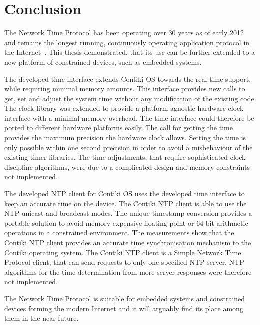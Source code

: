 




\chapter{Conclusion}
The Network Time Protocol has been operating over 30 years as of early 2012
and remains the longest running, continuously operating application
protocol in the Internet~\cite{ntp-y2k}.
This thesis demonstrated, that its use can be further extended to a new platform of constrained devices,
such as embedded systems.

The developed time interface extends Contiki OS towards the real-time support,
while requiring minimal memory amounts.
This interface provides new calls to get, set and adjust the system time without any modification
of the existing code.
The clock library was extended to provide a platform-agnostic hardware clock interface
with a minimal memory overhead.
The time interface could therefore be ported to different hardware platforms easily.
The call for getting the time provides the maximum precision the hardware clock allows.
Setting the time is only possible within one second precision in order to avoid
a misbehaviour of the existing timer libraries.
The time adjustments, that require sophisticated clock discipline algorithms,
were due to a complicated design and memory constraints not implemented.

The developed NTP client for Contiki OS uses the developed time interface to keep an accurate time on the device.
The Contiki NTP client is able to use the NTP unicast and broadcast modes.
The unique timestamp conversion provides a portable solution to avoid
memory expensive floating point or 64-bit arithmetic operations in a constrained environment.
The measurements show that the Contiki NTP client provides an accurate time
synchronisation mechanism to the Contiki operating system.
The Contiki NTP client is a Simple Network Time Protocol client,
that can send requests to only one specified NTP server.
NTP algorithms for the time determination from more server responses were therefore not implemented.

The Network Time Protocol is suitable for embedded systems and constrained devices
forming the modern Internet and it will arguably find its place among them in the near future.







